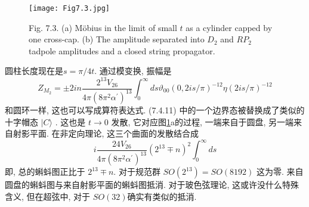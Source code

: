 \begin{figure}
	\begin{center}
		\texttt{[image: Fig7.3.jpg]}\\
		\caption{Fig. 7.3. (a) Möbius in the limit of small $t$ as a cylinder capped by one cross-cap. (b) The amplitude separated into $D_{2}$ and $R P_{2}$ tadpole amplitudes and a closed string propagator.}\label{Fig7.3}
	\end{center}
\end{figure}

圆柱长度现在是$s=\pi / 4 t$. 通过模变换, 振幅是
\begin{equation}
Z_{M_{2}}=\pm 2 i n \frac{2^{13} V_{26}}{4 \pi\left(8 \pi^{2} \alpha^{\prime}\right)^{13}} \int_{0}^{\infty} d s \vartheta_{00}(0,2 i s / \pi)^{-12} \eta(2 i s / \pi)^{-12}
\end{equation}
和圆环一样, 这也可以写成算符表达式. (7.4.11) 中的一个边界态被替换成了类似的十字帽态 $|C\rangle $ . 这也是 $t \rightarrow 0$ 发散, 它对应图\ref{Fig7.3}a的过程, 一端来自于圆盘, 另一端来自射影平面. 在非定向理论, 这三个曲面的发散结合成
\begin{equation}
	i \frac{24 V_{26}}{4 \pi\left(8 \pi^{2} \alpha^{\prime}\right)^{13}}\left(2^{13} \mp n\right)^{2} \int_{0}^{\infty} d s
\end{equation}
即, 总的蝌蚪图正比于 $2^{13} \mp n $. 对于规范群 $S O\left(2^{13}\right)=S O(8192)$ 这为零. 来自圆盘的蝌蚪图与来自射影平面的蝌蚪图抵消. 对于玻色弦理论, 这或许没什么特殊含义, 但在超弦中, 对于 $S O(32)$确实有类似的抵消.